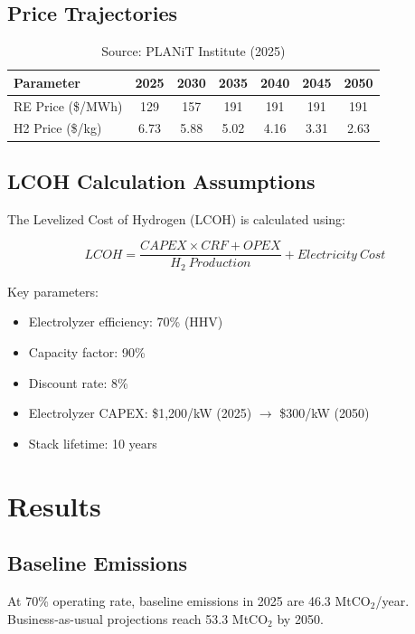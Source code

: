 \documentclass[12pt,a4paper]{article}
\begin{document}
\subsection{Price Trajectories}

\begin{table}[H]
\centering
\caption{Energy Price Trajectories}
\begin{tabular}{lcccccc}
\toprule
Parameter & 2025 & 2030 & 2035 & 2040 & 2045 & 2050 \\
\midrule
RE Price (\$/MWh) & 129 & 157 & 191 & 191 & 191 & 191 \\
H2 Price (\$/kg) & 6.73 & 5.88 & 5.02 & 4.16 & 3.31 & 2.63 \\
\bottomrule
\end{tabular}
\caption*{Source: PLANiT Institute (2025)}
\end{table}

\subsection{LCOH Calculation Assumptions}

The Levelized Cost of Hydrogen (LCOH) is calculated using:

\begin{equation}
LCOH = \frac{CAPEX \times CRF + OPEX}{H_2\ Production} + Electricity\ Cost
\end{equation}

Key parameters:
\begin{itemize}
    \item Electrolyzer efficiency: 70\% (HHV)
    \item Capacity factor: 90\%
    \item Discount rate: 8\%
    \item Electrolyzer CAPEX: \$1,200/kW (2025) $\rightarrow$ \$300/kW (2050)
    \item Stack lifetime: 10 years
\end{itemize}

\section{Results}

\subsection{Baseline Emissions}

At 70\% operating rate, baseline emissions in 2025 are 46.3 MtCO$_2$/year. Business-as-usual projections reach 53.3 MtCO$_2$ by 2050.
\end{document}

